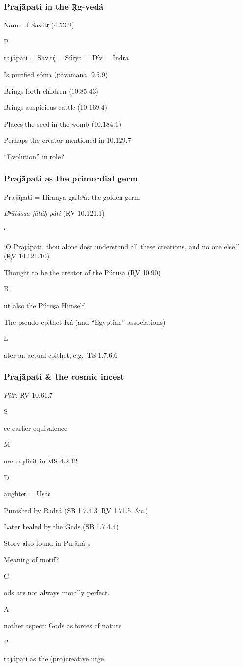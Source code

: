 \documentclass[pdf]{beamer}
\newcommand{\Subitem}[1]{{\setlength\itemindent{12pt} \item[-] #1}}
\newcommand{\Subsubitem}[1]{{\setlength\itemindent{24pt} \item[○] #1}}
\begin{document}
\begin{frame} \frametitle{Prajā́pati in the R̥g-vedá}
\begin{itemize}
	\item Name of Savitŕ̥ (4.53.2)
	\Subitem Prajā́pati = Savitŕ̥ = Sū́rya = Dív = Índra
	\item Is purified sóma (pávamāna, 9.5.9)
	\item Brings forth children (10.85.43)
	\item Brings auspicious cattle (10.169.4)
	\item Places the seed in the womb (10.184.1)
	\item Perhaps the creator mentioned in 10.129.7
	\item ``Evolution'' in role?
\end{itemize}
\end{frame}

\begin{frame} \frametitle{Prajā́pati as the primordial germ}
\begin{itemize}
	\item Prajā́pati = Hiraṇya-garbʰá: the golden germ
	\Subitem {\textit{Bʰūtásya jātáḥ páti} (R̥V 10.121.1)}
	\Subitem ``O Prajā́pati, thou alone dost understand all these creations, and no one else.'' (R̥V 10.121.10).
	\item Thought to be the creator of the Púruṣa (R̥V 10.90)
	\Subitem But also the Púruṣa Himself
	\item The pseudo-epithet Ká (and ``Egyptian'' associations)
	\Subitem Later an actual epithet, e.g.~TS 1.7.6.6
\end{itemize}
\end{frame}

\begin{frame} \frametitle{Prajā́pati \& the cosmic incest}
\begin{itemize}
	\item \textit{Pitŕ̥}: R̥V 10.61.7
	\Subitem See earlier equivalence
	\Subitem More explicit in MS 4.2.12
	\Subitem Daughter = Uṣás
	\item Punished by Rudrá (ṠB 1.7.4.3, R̥V 1.71.5, \&c.)
	\item Later healed by the Gods (ṠB 1.7.4.4)
	\item Story also found in Purāṇá-s
	\item Meaning of motif?
	\Subitem Gods are not always morally perfect.
	\Subitem Another aspect: Gods as forces of nature
	\Subsubitem Prajā́pati as the (pro)creative urge
\end{itemize}
\end{frame}
\end{document}
